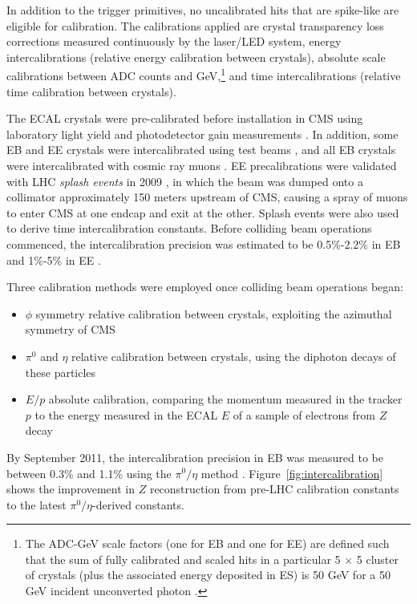\documentclass[dissertation.tex]{subfiles}
\begin{document}
In addition to the trigger primitives, no uncalibrated hits that are spike-like are eligible for calibration.  The calibrations applied are crystal transparency loss corrections measured continuously by the laser/LED system, energy intercalibrations (relative energy calibration between crystals), absolute scale calibrations between ADC counts and GeV,\footnote{The ADC-GeV scale factors (one for EB and one for EE) are defined such that the sum of fully calibrated and scaled hits in a particular 5 $\times$ 5 cluster of crystals (plus the associated energy deposited in ES) is 50 GeV for a 50 GeV incident unconverted photon \cite{calibration_IN}.} and time intercalibrations (relative time calibration between crystals).

The ECAL crystals were pre-calibrated before installation in CMS using laboratory light yield and photodetector gain measurements \cite{EB_performance_2006}.  In addition, some EB and EE crystals were intercalibrated using test beams \cite{EB_startup_intercalibration}, and all EB crystals were intercalibrated with cosmic ray muons \cite{CRAFT_calibration}.  EE precalibrations were validated with LHC \textit{splash events} in 2009 \cite{CRAFT_calibration, CRAFT_ECAL_performance}, in which the beam was dumped onto a collimator approximately 150 meters upstream of CMS, causing a spray of muons to enter CMS at one endcap and exit at the other.  Splash events were also used to derive time intercalibration constants.  Before colliding beam operations commenced, the intercalibration precision was estimated to be 0.5\%-2.2\% in EB and 1\%-5\% in EE \cite{CALOR_ECAL_calibration}.

Three calibration methods were employed once colliding beam operations began:

\begin{itemize}
\item $\phi$ symmetry relative calibration between crystals, exploiting the azimuthal symmetry of CMS
\item $\pi^{0}$ and $\eta$ relative calibration between crystals, using the diphoton decays of these particles
\item $E/p$ absolute calibration, comparing the momentum measured in the tracker $p$ to the energy measured in the ECAL $E$ of a sample of electrons from $Z$ decay
\end{itemize}
%
By September 2011, the intercalibration precision in EB was measured to be between 0.3\% and 1.1\% using the $\pi^{0}/\eta$ method \cite{Yang}.  Figure~\ref{fig:intercalibration} shows the improvement in $Z$ reconstruction from pre-LHC calibration constants to the latest $\pi^{0}/\eta$-derived constants.
\end{document}
